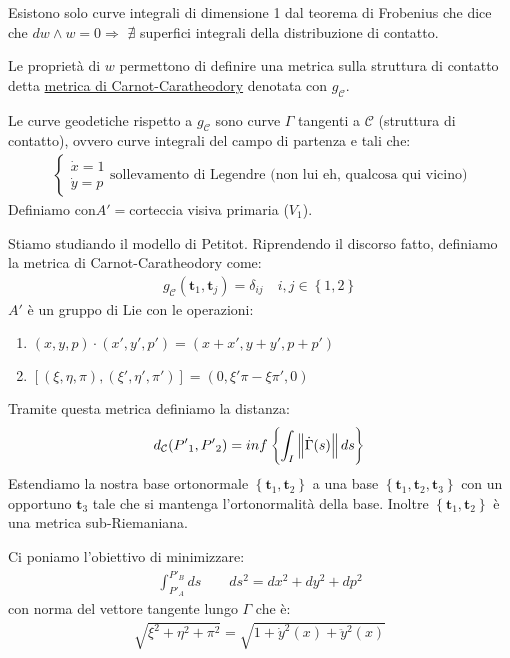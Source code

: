 Esistono solo curve integrali di dimensione 1 dal teorema di Frobenius che dice che $dw \wedge w=0\Rightarrow$ $\nexists$ superfici integrali della distribuzione di contatto.

Le proprietà di $w$ permettono di definire una metrica sulla struttura di contatto detta \ul{metrica di Carnot-Caratheodory} denotata con $g_\mathcal{C}$.

Le curve geodetiche rispetto a $g_\mathcal{C}$ sono curve $\Gamma$ tangenti a $\mathcal{C}$ (struttura di contatto), ovvero curve integrali del campo di partenza e tali che:
\begin{align*}
    \begin{cases*}
        \dot{x}=1\\
        \dot{y}=p
    \end{cases*}\text{sollevamento di Legendre (non lui eh, qualcosa qui vicino)}
\end{align*}
Definiamo con$A'=$corteccia visiva primaria ($V_1$).

Stiamo studiando il modello di Petitot. Riprendendo il discorso fatto, definiamo la metrica di Carnot-Caratheodory come:
\begin{align*}
    g_{\mathcal{C}}(\bm{t}_1,\bm{t}_j)=\delta_{ij}\quad i,j\in \left\{1,2\right\}
\end{align*}
$A'$ è un gruppo di Lie con le operazioni:
\begin{enumerate}
    \item $(x,y,p)\cdot (x',y',p')=(x+x',y+y',p+p')$
    \item $[(\xi,\eta,\pi),(\xi',\eta',\pi')]=(0,\xi'\pi-\xi\pi',0)$
\end{enumerate}
Tramite questa metrica definiamo la distanza:
\begin{align*}
    d_{\mathcal{C}}({P'}_1,{P'}_2)=inf\left\{\int_I \left\lVert\dot{\Gamma}(s)\right\rVert ds\right\}
\end{align*}
Estendiamo la nostra base ortonormale $\left\{\bm{t}_1,\bm{t}_2\right\}$ a una base $\left\{\bm{t}_1,\bm{t}_2,\bm{t}_3\right\}$ con un opportuno $\bm{t}_3$ tale che si mantenga l'ortonormalità della base.
Inoltre $\left\{\bm{t}_1,\bm{t}_2\right\}$ è una metrica sub-Riemaniana.

Ci poniamo l'obiettivo di minimizzare:
\begin{align*}
    \int_{{P'}_A}^{{P'}_{B}} ds \quad \quad ds^2=dx^2+dy^2+dp^2
\end{align*}
con norma del vettore tangente lungo $\Gamma$ che è:
\begin{align*}
    \sqrt{\xi^2+\eta^2+\pi^2}= \sqrt{1+\dot{y}^2(x)+\ddot{y}^2(x)}
\end{align*}


